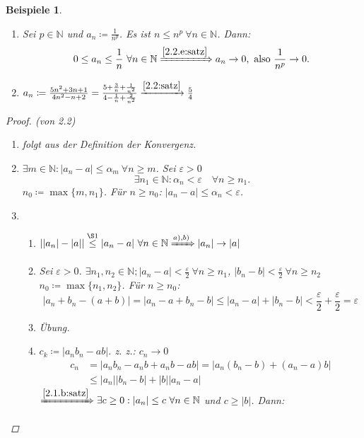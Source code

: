 \documentclass[12pt]{extreport} %
\newcommand{\N}{\mathbb{N}}
\theoremstyle{named}
\theoremstyle{dotless}
\newtheorem*{beispiele}{Beispiele}
\begin{document}
\begin{beispiele} \
	\begin{enumerate}
		\item Sei $p \in \N$ und $a_{n} \coloneqq \frac{1}{n^{p}}$. Es ist $n \leq n^{p} ~\forall n \in \N$. Dann: 
			$$ 0 \leq a_{n} \leq \frac{1}{n} ~\forall n \in \N \xRightarrow[]{\ref{2.2.e:satz}} a_{n} \rightarrow 0, \text{ also } \frac{1}{n^{p}} \rightarrow 0. $$
		\item $a_{n} \coloneqq \frac{5n^{2} + 3n + 1}{4n^{2} - n + 2} = \frac{5 + \frac{3}{n} + \frac{1}{n^{2}}}{4 - \frac{1}{n} + \frac{2}{n^{2}}} \xrightarrow[]{\ref{2.2:satz}} \frac{5}{4}$
	\end{enumerate}
	
	\begin{proof}(von 2.2) ~\
		\begin{enumerate}
			\item folgt aus der Definition der Konvergenz.
			\item $\exists m \in \N: |a_{n} - a | \leq \alpha_{m} ~\forall n \geq m$. Sei $\varepsilon > 0$
				$$
		 		\exists n_{1} \in \N: \alpha_{n} < \varepsilon \quad \forall n \geq n_{1}.
		 		$$
		 		$n_{0} \coloneqq \max \{ m , n_{1} \}$. Für $n \geq n_{0}$: $|a_{n} - a| \leq \alpha_{n} < \varepsilon$.
			\item \begin{enumerate}
				\item $| |a_{n}| - |a|| \overset{\S 1}{\leq} |a_{n} - a| ~\forall n \in \N \xRightarrow[]{a), b)} |a_{n}| \rightarrow |a|$
				\item Sei $\varepsilon > 0$. $\exists n_{1}, n_{2} \in \N; |a_{n} - a| < \frac{\varepsilon}{2} ~\forall n \geq n_{1}$, $|b_{n} - b| < \frac{\varepsilon}{2} ~\forall n \geq n_{2}$ \\
					$n_{0} \coloneqq \max \{ n_{1}, n_{2} \}$. Für $n \geq n_{0}$:
					$$
						|a_{n} + b_{n} - (a + b)| = |a_{n} - a + b_{n} - b| \leq |a_{n} - a| + |b_{n} - b| < \frac{\varepsilon}{2} + \frac{\varepsilon}{2} = \varepsilon
					$$
				\item Übung.
				\item $c_{k} \coloneqq |a_{n} b_{n} - ab|$. z. z.: $c_{n} \rightarrow 0$
					\begin{align*}
						c_{n} & = |a_{n}b_{n} - a_{n}b + a_{n}b - ab| = |a_{n}(b_{n} - b)+ (a_{n} - a)b| \\
							  & \leq |a_{n}||b_{n} - b| + |b||a_{n}-a|
					\end{align*}
					$\xRightarrow[]{\ref{2.1.b:satz}} \exists c \geq 0 : |a_{n}| \leq c ~\forall n \in \N$ und $c \geq |b|$. Dann:

\end{enumerate}
\end{enumerate}
\end{proof}
\end{beispiele}
\end{document}
